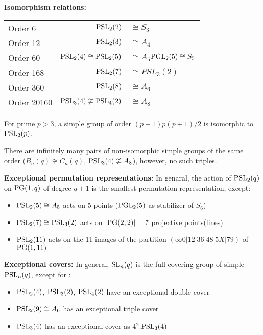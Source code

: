 \documentclass[a4paper,11pt]{article}
\begin{document}
\noindent\textbf{Isomorphism relations:}  
\begin{table}[htbp]
    \centering
    \begin{tabular}{lrl}
        Order 6 & $\mathrm{PSL}_2(2)$&$\cong S_3$\\
        Order 12 & $\mathrm{PSL}_2(3)$&$\cong A_4$\\
        Order 60 & $\mathrm{PSL}_2(4)\cong\mathrm{PSL}_2(5)$ &$\cong A_5$\qquad $\mathrm{PGL}_2(5)\cong S_5$\\
        Order 168 & $\mathrm{PSL}_2(7)$ &$\cong PSL_3(2)$\\
        Order 360 & $\mathrm{PSL}_2(8)$ &$\cong A_6$\\
        Order 20160 & $\mathrm{PSL}_3(4)\not\cong\mathrm{PSL}_4(2)$ &$\cong A_{8}$\\
    \end{tabular}
\end{table}

\begin{theorem}
    For prime $p > 3$, a simple group of order $(p - 1)p(p + 1)/2$ is isomorphic to $\mathrm{PSL}_2(p)$.
\end{theorem}

\begin{proposition}
    There are infinitely many pairs of non-isomorphic simple
groups of the same order ($B_n(q) \not\cong C_n(q)$, $\mathrm{PSL}_3(4) \not\cong A_8$), however, no such triples.
\end{proposition}



\noindent\textbf{Exceptional permutation representations:}
In genaral, the action of
$\mathrm{PSL}_2(q)$ on $\mathrm{PG}(1,q)$ of degree $q + 1$ is the smallest permutation representation, except:
\begin{itemize}
    \item $\mathrm{PSL}_2(5)\cong A_5$ acts on 5 points ($\mathrm{PGL}_2(5)$ as stabilizer of $S_6$)
    \item $\mathrm{PSL}_2(7)\cong \mathrm{PSL}_3(2)$ acts on $|\mathrm{PG}(2,2)|=7$ projective points(lines)
    \item $\mathrm{PSL}_2(11)$ acts on the 11 images of the partition $(\infty 0|12|36|48|5X|79)$ of $\mathrm{PG}(1, 11)$
\end{itemize}




\noindent\textbf{Exceptional covers:}
In general, $\mathrm{SL}_n(q)$ is the full covering group of simple $\mathrm{PSL}_n(q)$, except for :
\begin{itemize}
    \item $\mathrm{PSL}_2(4)$, $\mathrm{PSL}_3(2)$, $\mathrm{PSL}_4(2)$ have an exceptional double cover
    \item $\mathrm{PSL}_2(9)\cong A_6$ has an exceptional triple cover
    \item $\mathrm{PSL}_3(4)$ has an exceptional cover as $4^2.\mathrm{PSL}_3(4)$
\end{itemize}
\end{document}
